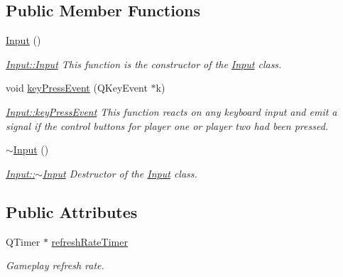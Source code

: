 \subsection*{Public Member Functions}
\begin{DoxyCompactItemize}
\item 
\hyperlink{class_input_abae3f379d3f157cf42dc857309832dba}{Input} ()\hypertarget{class_input_abae3f379d3f157cf42dc857309832dba}{}\label{class_input_abae3f379d3f157cf42dc857309832dba}

\begin{DoxyCompactList}\small\item\em \hyperlink{class_input_abae3f379d3f157cf42dc857309832dba}{Input\+::\+Input} This function is the constructor of the \hyperlink{class_input}{Input} class. \end{DoxyCompactList}\item 
void \hyperlink{class_input_af33a8e4ba483419bd40b1c20ccc1cd7f}{key\+Press\+Event} (Q\+Key\+Event $\ast$k)
\begin{DoxyCompactList}\small\item\em \hyperlink{class_input_af33a8e4ba483419bd40b1c20ccc1cd7f}{Input\+::key\+Press\+Event} This function reacts on any keyboard input and emit a signal if the control buttons for player one or player two had been pressed. \end{DoxyCompactList}\item 
\hyperlink{class_input_af2db35ba67c8a8ccd23bef6a482fc291}{$\sim$\+Input} ()\hypertarget{class_input_af2db35ba67c8a8ccd23bef6a482fc291}{}\label{class_input_af2db35ba67c8a8ccd23bef6a482fc291}

\begin{DoxyCompactList}\small\item\em \hyperlink{class_input_af2db35ba67c8a8ccd23bef6a482fc291}{Input\+::$\sim$\+Input} Destructor of the \hyperlink{class_input}{Input} class. \end{DoxyCompactList}\end{DoxyCompactItemize}
\subsection*{Public Attributes}
\begin{DoxyCompactItemize}
\item 
Q\+Timer $\ast$ \hyperlink{class_input_a3196d6cd66f0491bc90fd7a48e2d9c9c}{refresh\+Rate\+Timer}\hypertarget{class_input_a3196d6cd66f0491bc90fd7a48e2d9c9c}{}\label{class_input_a3196d6cd66f0491bc90fd7a48e2d9c9c}

\begin{DoxyCompactList}\small\item\em Gameplay refresh rate. \end{DoxyCompactList}\end{DoxyCompactItemize}


